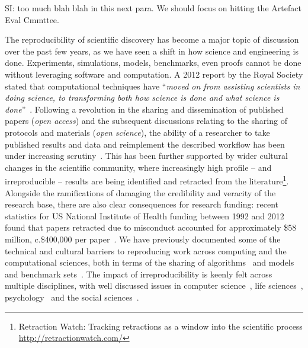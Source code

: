 \documentclass{llncs}
\begin{document}
SI: too much blah blah in this next para. We should focus on hitting
the Artefact Eval Cmmttee.

The reproducibility of scientific discovery has become a major topic
of discussion over the past few years, as we have seen a shift in how
science and engineering is done. Experiments, simulations, models,
benchmarks, even proofs cannot be done without leveraging software and
computation. A 2012 report by the Royal Society stated that
computational techniques have ``{\emph{moved on from assisting
scientists in doing science, to transforming both how science is done
and what science is done}}''~\cite{rssaaoe:2012}. Following a
revolution in the sharing and dissemination of published papers
(\emph{open access}) and the subsequent discussions relating to the
sharing of protocols and materials (\emph{open science}), the ability
of a researcher to take published results and data and reimplement the
described workflow has been under increasing
scrutiny~\cite{stodden-et-al:2013,sandve-et-al:2013,wilson-et-al:2014}. This
has been further supported by wider cultural changes in the scientific
community, where increasingly high profile -- and irreproducible --
results are being identified and retracted from the
literature\footnote{Retraction Watch: Tracking retractions as a window
into the scientific
process\\\url{http://retractionwatch.com/}}. Alongside the
ramifications of damaging the credibility and veracity of the research
base, there are also clear consequences for research funding: recent
statistics for US National Institute of Health funding between 1992
and 2012 found that papers retracted due to misconduct accounted for
approximately \$58 million, c.\$400,000 per
paper~\cite{stern-et-al:2014}. We have previously documented some of
the technical and cultural barriers to reproducing work across
computing and the computational sciences, both in terms of the sharing
of algorithms~\cite{crick-et-al_recomp2014} and models and benchmark
sets~\cite{crick-et-al_wssspe2}. The impact of irreproducibility is
keenly felt across multiple disciplines, with well discussed issues in
computer science~\cite{collberg-et-al:2014}, life
sciences~\cite{rollins-et-al:2014},
psychology~\cite{chambers-et-al:2014} and the social
sciences~\cite{conte-et-al:2012}.
\end{document}
